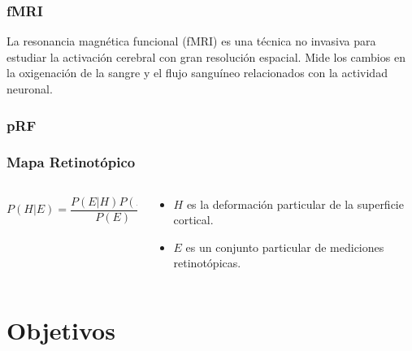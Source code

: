 \documentclass[
11pt, %
%
aspectratio=169, %
]{beamer}
\begin{document}
	\begin{frame}
		\frametitle{fMRI}
		\begin{block}{}
			La resonancia magnética funcional (fMRI) es una técnica no invasiva para estudiar
			la activación cerebral con gran resolución espacial. Mide los cambios en la oxigenación de la sangre y el flujo sanguíneo relacionados con la actividad neuronal.
		\end{block}
	

		
	\end{frame}
	
	
	\begin{frame}
		\frametitle{pRF}
	
		
		
		
	\end{frame}
	
	
	\begin{frame}
		\frametitle{Mapa Retinot\'opico}
		
			\begin{columns}[t] %
			\begin{column}{0.5\textwidth} %
				\centering
				\begin{equation}
					P(H|E) = \dfrac{P(E|H)P(H)}{P(E)}
				\end{equation}
				
				
			\end{column}
			\begin{column}{0.5\textwidth} %
				\centering
				\begin{itemize} 			
					\item $H$ es la deformación particular de la superficie cortical.		
					\item $E$ es un conjunto particular de mediciones retinotópicas.
				
				\end{itemize}	
				
				
			\end{column}
		\end{columns}
		

	\end{frame}


	\section{Objetivos} %
\end{document}
